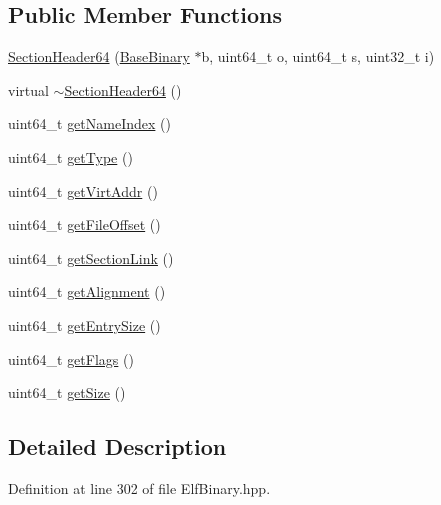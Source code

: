 \subsection*{\-Public \-Member \-Functions}
\begin{DoxyCompactItemize}
\item 
\hyperlink{class_e_p_a_x_1_1_elf_1_1_section_header64_a093e7ab0649ce9c396705d832b593018}{\-Section\-Header64} (\hyperlink{class_e_p_a_x_1_1_base_binary}{\-Base\-Binary} $\ast$b, uint64\-\_\-t o, uint64\-\_\-t s, uint32\-\_\-t i)
\item 
virtual \hyperlink{class_e_p_a_x_1_1_elf_1_1_section_header64_a4824e1c075af9b6939dfa2c67907979e}{$\sim$\-Section\-Header64} ()
\item 
uint64\-\_\-t \hyperlink{class_e_p_a_x_1_1_elf_1_1_section_header64_a4c83a831f07f96738a32fefd2f55b669}{get\-Name\-Index} ()
\item 
uint64\-\_\-t \hyperlink{class_e_p_a_x_1_1_elf_1_1_section_header64_a8556b692a71aba5e1048a7152cb1d837}{get\-Type} ()
\item 
uint64\-\_\-t \hyperlink{class_e_p_a_x_1_1_elf_1_1_section_header64_a5d82c8c6748a80bb0d53b8d6a6a9c3fb}{get\-Virt\-Addr} ()
\item 
uint64\-\_\-t \hyperlink{class_e_p_a_x_1_1_elf_1_1_section_header64_acd9363817d1fbab5194a3da55e8a7240}{get\-File\-Offset} ()
\item 
uint64\-\_\-t \hyperlink{class_e_p_a_x_1_1_elf_1_1_section_header64_aed1f49f68dc2b948fb8c5fe7d6df6ec5}{get\-Section\-Link} ()
\item 
uint64\-\_\-t \hyperlink{class_e_p_a_x_1_1_elf_1_1_section_header64_a8efa6c61a662689bd23732884b4a9aa5}{get\-Alignment} ()
\item 
uint64\-\_\-t \hyperlink{class_e_p_a_x_1_1_elf_1_1_section_header64_a3b16015c2864179254466fa389a5b90e}{get\-Entry\-Size} ()
\item 
uint64\-\_\-t \hyperlink{class_e_p_a_x_1_1_elf_1_1_section_header64_a4ca003bc2633ba8e16824a0d6f9f5dd1}{get\-Flags} ()
\item 
uint64\-\_\-t \hyperlink{class_e_p_a_x_1_1_elf_1_1_section_header64_a0b4f7cd68d065481a6953240f55f8073}{get\-Size} ()
\end{DoxyCompactItemize}


\subsection{\-Detailed \-Description}


\-Definition at line 302 of file \-Elf\-Binary.\-hpp.



